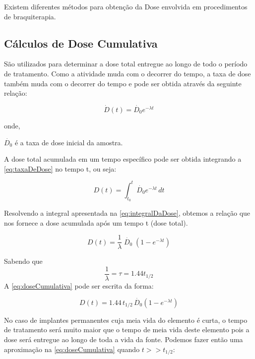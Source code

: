 \documentclass[11pt,a4paper]{article}
\begin{document}
		Existem diferentes métodos para obtenção da Dose envolvida em procedimentos de braquiterapia. 

		\subsection{Cálculos de Dose Cumulativa}

			São utilizados para determinar a dose total entregue ao longo de todo o período de tratamento. Como a atividade muda com o decorrer do tempo, a taxa de dose também muda com o decorrer do tempo e pode ser obtida através da seguinte relação:

				\begin{equation}
					\dot{D}(t) = \dot{D_0} e^{-\lambda t}
					\label{eq:taxaDeDose}
				\end{equation}

			onde,

			$\dot{D_0}$ é a taxa de dose inicial da amostra.

			A dose total acumulada em um tempo específico pode ser obtida integrando a   \ref{eq:taxaDeDose} no tempo t, ou seja:

				\begin{equation}
					D(t) = \int_{t_0}^{t} \dot{D_0} e^{-\lambda t}\,dt
					\label{eq:integralDaDose}
				\end{equation}

			Resolvendo a integral apresentada na   \ref{eq:integralDaDose}, obtemos a relação que nos fornece a dose acumulada após um tempo t (dose total).

				\begin{equation}
					D(t) = \frac{1}{\lambda} \; \dot{D_0} \; (1 - e^{-\lambda t})
					\label{eq:doseCumulativa}
				\end{equation}

			Sabendo que $$\frac{1}{\lambda} = \tau = 1.44 t_{1/2}$$ A   \ref{eq:doseCumulativa} pode ser escrita da forma:

				\begin{equation}
					D(t) = 1.44\,t_{1/2} \,\dot{D_0} (1 - e^{-\lambda t})
				\end{equation}

			No caso de implantes permanentes cuja meia vida do elemento é curta, o tempo de tratamento será muito maior que o tempo de meia vida deste elemento pois a dose será entregue ao longo de toda a vida da fonte. Podemos fazer então uma aproximação na   \ref{eq:doseCumulativa} quando $t >> t_{1/2}$: 
\end{document}
